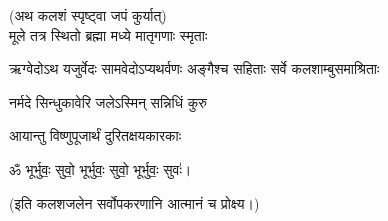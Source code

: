 (अथ कलशं स्पृष्ट्वा जपं कुर्यात्) \\

{मूले तत्र स्थितो ब्रह्मा मध्ये मातृगणाः स्मृताः}

{ऋग्वेदोऽथ यजुर्वेदः सामवेदोऽप्यथर्वणः}
{अङ्गैश्च सहिताः सर्वे कलशाम्बुसमाश्रिताः}

{नर्मदे सिन्धुकावेरि जलेऽस्मिन् सन्निधिं कुरु}

{आयान्तु विष्णुपूजार्थं दुरितक्षयकारकाः}

\centerline{ॐ भूर्भुवः॒ सुवो॒ भूर्भुवः॒ सुवो॒ भूर्भुवः॒ सुवः॑।}

(इति कलशजलेन सर्वोपकरणानि आत्मानं च प्रोक्ष्य।)




